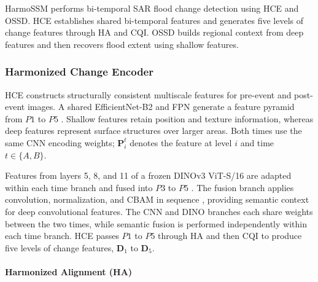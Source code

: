 \documentclass[authoryear,preprint,12pt]{elsarticle}
\begin{document}
HarmoSSM performs bi-temporal SAR flood change detection using HCE and OSSD. HCE establishes shared bi-temporal features and generates five levels of change features through HA and CQI. OSSD builds regional context from deep features and then recovers flood extent using shallow features.

\subsubsection{Harmonized Change Encoder}\label{sec:encoder}\label{sec:ha}\label{sec:cqi}

HCE constructs structurally consistent multiscale features for pre-event and post-event images. A shared EfficientNet-B2 and FPN generate a feature pyramid from \(P1\) to \(P5\) \citep{tan2019efficientnet,lin2017fpn}. Shallow features retain position and texture information, whereas deep features represent surface structures over larger areas. Both times use the same CNN encoding weights; \(\mathbf P_i^t\) denotes the feature at level \(i\) and time \(t\in\{A,B\}\).

Features from layers 5, 8, and 11 of a frozen DINOv3 ViT-S/16 are adapted within each time branch and fused into \(P3\) to \(P5\) \citep{simeoni2025dinov3}. The fusion branch applies convolution, normalization, and CBAM in sequence \citep{woo2018cbam}, providing semantic context for deep convolutional features. The CNN and DINO branches each share weights between the two times, while semantic fusion is performed independently within each time branch. HCE passes \(P1\) to \(P5\) through HA and then CQI to produce five levels of change features, \(\mathbf D_1\) to \(\mathbf D_5\).

\paragraph{Harmonized Alignment (HA)}
\end{document}
